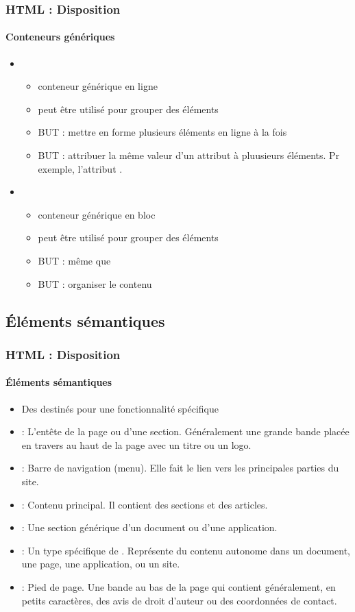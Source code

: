 \documentclass[xcolor=table]{beamer}
\begin{document}
\begin{frame}[fragile]
\frametitle{HTML : Disposition}
\framesubtitle{Conteneurs génériques}

\begin{itemize}
	\item {}
	\begin{itemize}
		\item conteneur générique en ligne
		\item peut être utilisé pour grouper des éléments
		\item BUT : mettre en forme plusieurs éléments en ligne à la fois
		\item BUT : attribuer la même valeur d'un attribut à pluusieurs éléments. 
		Pr exemple, l'attribut .
	\end{itemize}
	\item {}
	\begin{itemize}
		\item conteneur générique en bloc
		\item peut être utilisé pour grouper des éléments
		\item BUT : même que 
		\item BUT : organiser le contenu
	\end{itemize}
\end{itemize}

\end{frame}

\subsection{Éléments sémantiques}

\begin{frame}[fragile]
\frametitle{HTML : Disposition}
\framesubtitle{Éléments sémantiques}

\begin{itemize}
	\item Des  destinés pour une fonctionnalité spécifique
	\item {} : L'entête de la page ou d'une section. Généralement une grande bande placée en travers au haut de la page avec un titre ou un logo.
	\item {} : Barre de navigation (menu). Elle fait le lien vers les principales parties du site.
	\item {} : Contenu principal. Il contient des sections et des articles.
	\item {} : Une section générique d'un document ou d'une application. 
	\item {} : Un type spécifique de . Représente du contenu autonome dans un document, une page, une application, ou un site.
	\item {} : Pied de page. Une bande au bas de la page qui contient généralement, en petits caractères, des avis de droit d'auteur ou des coordonnées de contact.
\end{itemize}

\end{frame}
\end{document}
